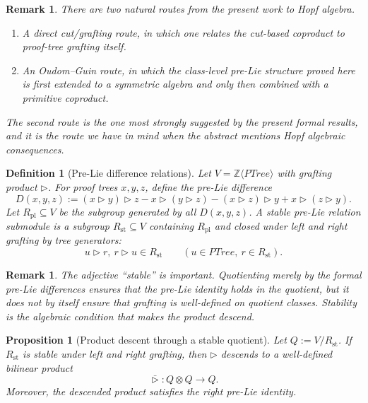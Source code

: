 \documentclass[11pt]{article}
\newtheorem{proposition}[theorem]{Proposition}
\newtheorem{definition}[theorem]{Definition}
\newtheorem{remark}[theorem]{Remark}
\newcommand{\PTree}{\mathit{PTree}}
\newcommand{\ZZ}{\mathbb{Z}}
\begin{document}
\begin{remark}
There are two natural routes from the present work to Hopf algebra.
\begin{enumerate}[label=\textup{(\roman*)}]
\item A direct cut/grafting route, in which one relates the cut-based coproduct
to proof-tree grafting itself.
\item An Oudom--Guin route, in which the class-level pre-Lie structure proved
here is first extended to a symmetric algebra and only then combined with a
primitive coproduct.
\end{enumerate}
The second route is the one most strongly suggested by the present formal
results, and it is the route we have in mind when the abstract mentions Hopf
algebraic consequences.
\end{remark}

\begin{definition}[Pre-Lie difference relations]
Let \(V=\ZZ\langle\PTree\rangle\) with grafting product
\(\triangleright\). For proof trees \(x,y,z\), define the \emph{pre-Lie
difference}
\[
D(x,y,z):=
(x\triangleright y)\triangleright z
-x\triangleright (y\triangleright z)
-(x\triangleright z)\triangleright y
+x\triangleright (z\triangleright y).
\]
Let \(R_{\mathrm{pl}}\subseteq V\) be the subgroup generated by all
\(D(x,y,z)\). A \emph{stable pre-Lie relation submodule} is a subgroup
\(R_{\mathrm{st}}\subseteq V\) containing \(R_{\mathrm{pl}}\) and closed under
left and right grafting by tree generators:
\[
u\triangleright r,\ r\triangleright u\in R_{\mathrm{st}}
\qquad
(u\in\PTree,\ r\in R_{\mathrm{st}}).
\]
\end{definition}

\begin{remark}
The adjective ``stable'' is important. Quotienting merely by the formal
pre-Lie differences ensures that the pre-Lie identity holds in the quotient,
but it does not by itself ensure that grafting is well-defined on quotient
classes. Stability is the algebraic condition that makes the product descend.
\end{remark}

\begin{proposition}[Product descent through a stable quotient]
Let \(Q:=V/R_{\mathrm{st}}\). If \(R_{\mathrm{st}}\) is stable under left and
right grafting, then \(\triangleright\) descends to a well-defined bilinear
product
\[
\bar{\triangleright}:Q\otimes Q\to Q.
\]
Moreover, the descended product satisfies the right pre-Lie identity.
\end{proposition}
\end{document}
